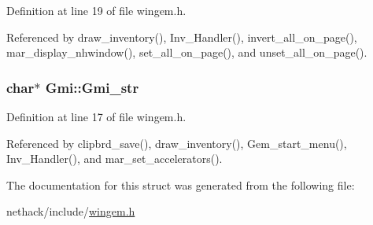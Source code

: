Definition at line 19 of file wingem.\+h.



Referenced by draw\+\_\+inventory(), Inv\+\_\+\+Handler(), invert\+\_\+all\+\_\+on\+\_\+page(), mar\+\_\+display\+\_\+nhwindow(), set\+\_\+all\+\_\+on\+\_\+page(), and unset\+\_\+all\+\_\+on\+\_\+page().

\hypertarget{structGmi_a85ef1b8a2f2bb42a78fa3d6a53dddfcb}{
\subsubsection[{Gmi\+\_\+str}]{\setlength{\rightskip}{0pt plus 5cm}char$\ast$ Gmi\+::\+Gmi\+\_\+str}}\label{structGmi_a85ef1b8a2f2bb42a78fa3d6a53dddfcb}


Definition at line 17 of file wingem.\+h.



Referenced by clipbrd\+\_\+save(), draw\+\_\+inventory(), Gem\+\_\+start\+\_\+menu(), Inv\+\_\+\+Handler(), and mar\+\_\+set\+\_\+accelerators().



The documentation for this struct was generated from the following file\+:\begin{DoxyCompactItemize}
\item 
nethack/include/\hyperlink{wingem_8h}{wingem.\+h}\end{DoxyCompactItemize}
